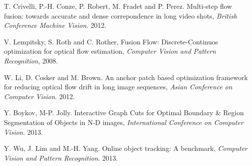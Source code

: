 \begin{thebibliography}{99}
T. Crivelli, P.-H. Conze, P. Robert, M. Fradet and P. Perez. Multi-step flow fusion: towards accurate and dense correpondence in long video shots, {\it British Conference Machine Vision}. 2012.

V. Lempitsky, S. Roth and C. Rother, Fusion Flow: Discrete-Continuos optimization for optical flow estimation, {\it Computer Vision and Pattern Recognition}, 2008.

W. Li, D. Cosker and M. Brown. An anchor patch based optimization framework for reducing optical flow drift in long image sequences, {\it Asian Conference on Computer Vision}. 2012.

Y. Boykov, M-P. Jolly. Interactive Graph Cuts for Optimal Boundary \& Region Segmentation of Objects in N-D images, {\it International Conference on Computer Vision}. 2013.

Y. Wu, J. Lim and M.-H. Yang. Online object tracking: A benchmark, {\it Computer Vision and Pattern Recognition}. 2013.

\end{thebibliography}